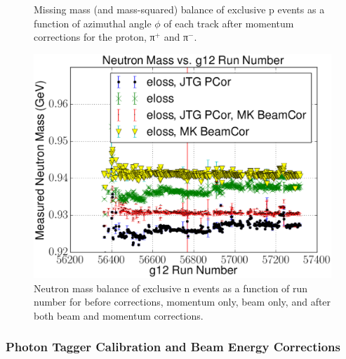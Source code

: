 \begin{figure}
\begin{center}
\begin{subfigure}{0.4\columnwidth}
\end{subfigure}
\caption[Momentum Balance Before Corrections]{\label{fig:mmbal}Missing mass (and mass-squared) balance of exclusive p \π[+] \π[-] events as a function of azimuthal angle $\phi$ of each track after momentum corrections for the proton, π$^+$ and π$^-$.}
\end{center}\end{figure}

\begin{figure}\begin{center}
\includegraphics[width=0.6\columnwidth]{figures/corrections/C3pi_allcorr_neutron_rxr.eps}
\caption[Run by run Mass Balance Before and After Corrections]{\label{fig:mbal_pcor}Neutron mass balance of exclusive n \π[+] \π[+] \π[-] events as a function of run number for before corrections, momentum only, beam only, and after both beam and momentum corrections.}
\end{center}\end{figure}


\FloatBarrier


\subsubsection{\label{sec:calib.tag}Photon Tagger Calibration and Beam Energy Corrections}

